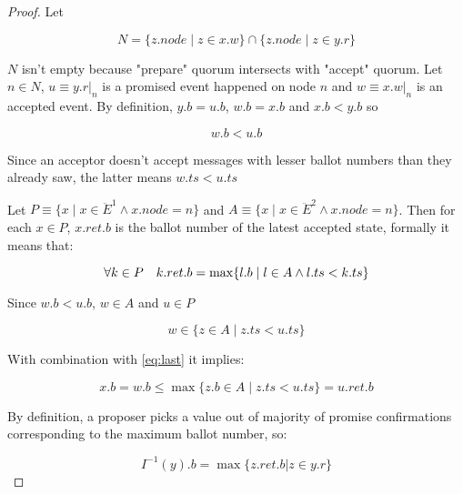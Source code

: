\documentclass[a4paper,USenglish]{lipics-v2018}
\theoremstyle{definition}
\begin{document}
\begin{appendices}
        \begin{proof}
            Let
            
            $$N = \{z.node \;|\; z \in x.w\} \cap \{z.node \;|\; z \in y.r\}$$
          
            $N$ isn't empty because "prepare" quorum intersects with "accept" quorum. Let $n \in N$, $u \equiv y.r |_n$ is a promised event happened on node $n$ and $w \equiv x.w |_n$ is an accepted event. By definition, $y.b = u.b$, $w.b = x.b$ and $x.b < y.b$ so
          
            \begin{equation}
                w.b < u.b
            \end{equation}
        
            Since an acceptor doesn’t accept messages with lesser ballot numbers than they already saw, the latter means $w.ts < u.ts$
          
            Let $P \equiv \{ x \;|\; x \in \ddot{E}^1 \land x.node = n\}$ and $A \equiv \{ x \;|\; x \in \ddot{E}^2 \land x.node = n \}$. Then for each $x \in P$, $x.ret.b$ is the ballot number of the latest accepted state, formally it means that:
          
            \begin{equation} \label{eq:last}
                \forall k \in P \quad k.ret.b = \max \{ l.b \;|\;l \in A \land l.ts < k.ts \} \\
            \end{equation}
          
            Since $w.b < u.b$, $w \in A$ and $u \in P$
          
            \begin{equation}
                w \in \{ z \in A \;|\; z.ts < u.ts \}
            \end{equation}
          
            With combination with \ref{eq:last} it implies:
          
            \begin{equation} \label{eq:final}
                x.b = w.b \leq \max \{ z.b \in A \;|\; z.ts < u.ts \} = u.ret.b
            \end{equation}
          
            By definition, a proposer picks a value out of majority of promise confirmations corresponding to the maximum ballot number, so:
          
            \begin{equation}
                I^{-1}(y).b = \max \{ z.ret.b | z \in y.r \}
            \end{equation}
          

\end{proof}
\end{appendices}
\end{document}
